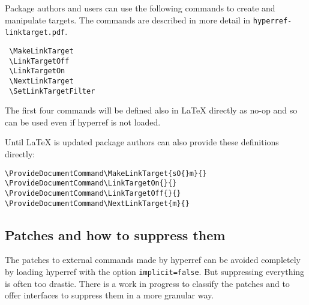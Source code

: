 \documentclass{article}
\newcommand*{\xpackage}[1]{\textsf{#1}}
\begin{document}
Package authors and users can use the following commands to create and manipulate
targets. The commands are described in more detail in \texttt{hyperref-linktarget.pdf}.

\begin{verbatim}
 \MakeLinkTarget
 \LinkTargetOff
 \LinkTargetOn
 \NextLinkTarget
 \SetLinkTargetFilter
\end{verbatim}

The first four commands will be defined also in \LaTeX{} directly as no-op and so can be
used even if \xpackage{hyperref} is not loaded.

Until \LaTeX{} is updated package authors can also provide these definitions directly:

\begin{verbatim}
\ProvideDocumentCommand\MakeLinkTarget{sO{}m}{}
\ProvideDocumentCommand\LinkTargetOn{}{}
\ProvideDocumentCommand\LinkTargetOff{}{}
\ProvideDocumentCommand\NextLinkTarget{m}{}
\end{verbatim}

\subsection{Patches and how to suppress them}

The patches to external commands made by
\xpackage{hyperref} can be avoided completely by loading \xpackage{hyperref}
with the option \texttt{implicit=false}.
But suppressing everything is often too drastic.
There is a work in progress to classify
the patches and to offer interfaces to suppress them in a more granular way.
\end{document}

